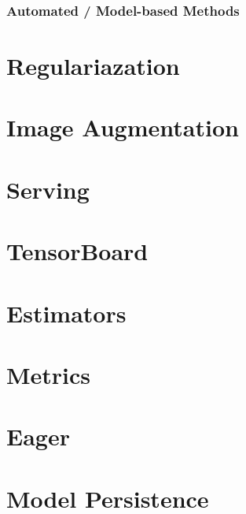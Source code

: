 \subsubsection{Automated / Model-based Methods}


\section{Regulariazation}

\section{Image Augmentation}

\section{Serving}

\section{TensorBoard}

\section{Estimators}

\section{Metrics}

\section{Eager}

\section{Model Persistence}

